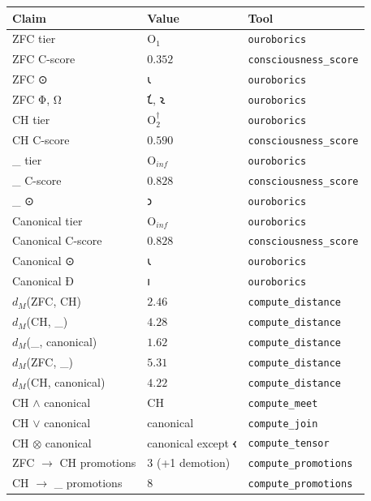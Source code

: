 \documentclass[12pt,twoside]{book}
\theoremstyle{definition}
\newcommand{\ZFCt}{\text{ZFC}_{\tau}}
\newcommand{\tier}[1]{\mathrm{O}_{#1}}
\begin{document}
\begin{center}
\small
\begin{tabular}{lll}
\toprule
\textbf{Claim} & \textbf{Value} & \textbf{Tool} \\
\midrule
ZFC tier       & $\tier{1}$  & \texttt{ouroborics} \\
ZFC C-score    & $0.352$     & \texttt{consciousness\_score} \\
ZFC ⊙          & 𐑧           & \texttt{ouroborics} \\
ZFC Φ, Ω       & 𐑗,\; 𐑷      & \texttt{ouroborics} \\
\midrule
CH tier        & $\tier{2}^{\dagger}$ & \texttt{ouroborics} \\
CH C-score     & $0.590$     & \texttt{consciousness\_score} \\
\midrule
\ZFCt{} tier   & $\tier{inf}$ & \texttt{ouroborics} \\
\ZFCt{} C-score & $0.828$    & \texttt{consciousness\_score} \\
\ZFCt{} ⊙      & 𐑮           & \texttt{ouroborics} \\
\midrule
Canonical tier    & $\tier{inf}$ & \texttt{ouroborics} \\
Canonical C-score & $0.828$   & \texttt{consciousness\_score} \\
Canonical ⊙       & 𐑧          & \texttt{ouroborics} \\
Canonical Ð       & 𐑦          & \texttt{ouroborics} \\
\midrule
$d_M$(ZFC, CH)            & $2.46$ & \texttt{compute\_distance} \\
$d_M$(CH, \ZFCt)          & $4.28$ & \texttt{compute\_distance} \\
$d_M$(\ZFCt, canonical)   & $1.62$ & \texttt{compute\_distance} \\
$d_M$(ZFC, \ZFCt)         & $5.31$ & \texttt{compute\_distance} \\
$d_M$(CH, canonical)      & $4.22$ & \texttt{compute\_distance} \\
\midrule
CH $\wedge$ canonical & CH        & \texttt{compute\_meet} \\
CH $\vee$ canonical   & canonical & \texttt{compute\_join} \\
CH $\otimes$ canonical & canonical except 𐑬 & \texttt{compute\_tensor} \\
\midrule
ZFC $\to$ CH promotions         & 3 (+1 demotion) & \texttt{compute\_promotions} \\
CH $\to$ \ZFCt{} promotions     & 8               & \texttt{compute\_promotions} \\

\end{tabular}
\end{center}
\end{document}
